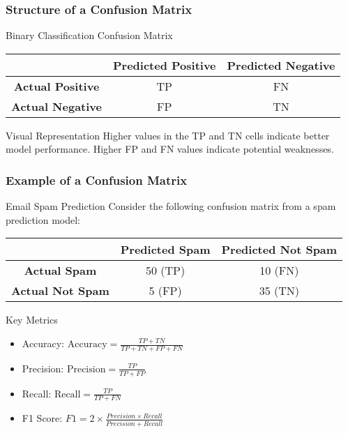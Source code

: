 \documentclass[aspectratio=169]{beamer}
\begin{document}
\begin{frame}[fragile]
    \frametitle{Structure of a Confusion Matrix}
    \begin{block}{Binary Classification Confusion Matrix}
        \begin{center}
            \begin{tabular}{|c|c|c|}
                \hline
                & \textbf{Predicted Positive} & \textbf{Predicted Negative} \\
                \hline
                \textbf{Actual Positive} & TP & FN \\
                \hline
                \textbf{Actual Negative} & FP & TN \\
                \hline
            \end{tabular}
        \end{center}
    \end{block}
    \begin{block}{Visual Representation}
        Higher values in the TP and TN cells indicate better model performance. Higher FP and FN values indicate potential weaknesses.
    \end{block}
\end{frame}

\begin{frame}[fragile]
    \frametitle{Example of a Confusion Matrix}
    \begin{block}{Email Spam Prediction}
        Consider the following confusion matrix from a spam prediction model:
        \begin{center}
            \begin{tabular}{|c|c|c|}
                \hline
                & \textbf{Predicted Spam} & \textbf{Predicted Not Spam} \\
                \hline
                \textbf{Actual Spam} & 50 (TP) & 10 (FN) \\
                \hline
                \textbf{Actual Not Spam} & 5 (FP) & 35 (TN) \\
                \hline
            \end{tabular}
        \end{center}
    \end{block}
    \begin{block}{Key Metrics}
        \begin{itemize}
            \item Accuracy: \( \text{Accuracy} = \frac{TP + TN}{TP + TN + FP + FN} \)
            \item Precision: \( \text{Precision} = \frac{TP}{TP + FP} \)
            \item Recall: \( \text{Recall} = \frac{TP}{TP + FN} \)
            \item F1 Score: \( F1 = 2 \times \frac{Precision \times Recall}{Precision + Recall} \)
        \end{itemize}
    \end{block}
\end{frame}
\end{document}
